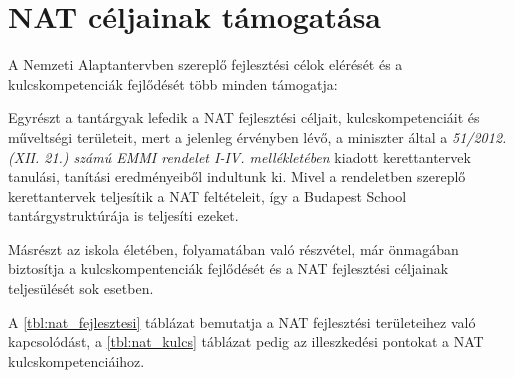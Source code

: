 \section{NAT céljainak támogatása}

A Nemzeti Alaptantervben szereplő fejlesztési célok elérését és a
kulcskompetenciák fejlődését több minden támogatja:

Egyrészt a tantárgyak lefedik a NAT fejlesztési céljait, kulcskompetenciáit és
műveltségi területeit, mert a jelenleg érvényben lévő, a miniszter által a
\emph{51/2012. (XII. 21.) számú EMMI rendelet I-IV. mellékletében} kiadott
kerettantervek \citep{ofi:kerettanterv} tanulási, tanítási eredményeiből
indultunk ki. Mivel a rendeletben szereplő kerettantervek teljesítik a NAT
feltételeit, így a Budapest School tantárgystruktúrája is teljesíti ezeket.

Másrészt az iskola életében, folyamatában való részvétel, már önmagában
biztosítja a kulcskompentenciák fejlődését és a NAT fejlesztési céljainak
teljesülését sok esetben.

A \ref{tbl:nat_fejlesztesi} táblázat bemutatja a NAT fejlesztési területeihez
való kapcsolódást, a
\ref{tbl:nat_kulcs} táblázat pedig az illeszkedési pontokat a NAT
kulcskompetenciáihoz.

